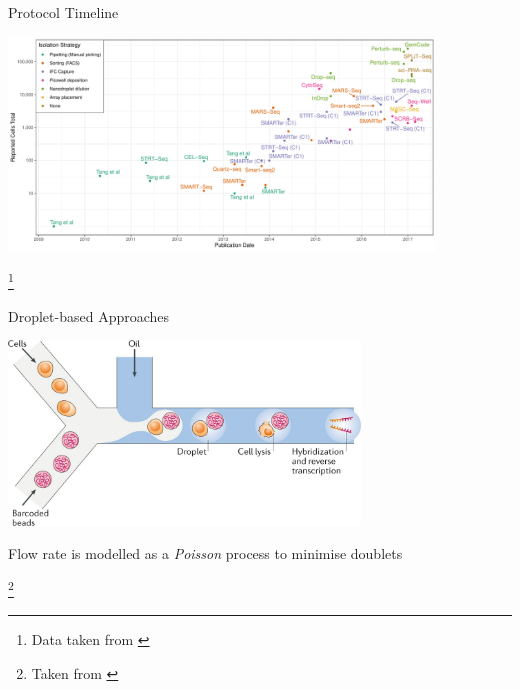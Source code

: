 \documentclass[aspectratio=169,11pt]{beamer}
\newcommand\blfootnote[1]{%
  \begingroup
  \renewcommand\thefootnote{}\footnote{#1}%
  \addtocounter{footnote}{-1}%
  \endgroup
}
\begin{document}
\begin{frame}{Protocol Timeline}

	\begin{center}
		\includegraphics[width=0.85\textwidth]{figures/scRNATimeline.pdf} 
	\end{center}

	\blfootnote{Data taken from \cite{pmid29494575}}

\end{frame}

\begin{frame}{Droplet-based Approaches}

	\begin{center}
		\includegraphics[width=0.7\textwidth]{figures/Droplet.jpg}
	\end{center}
	
	\pause
	Flow rate is modelled as a \textit{Poisson} process to minimise doublets
	
	\blfootnote{Taken from \cite{pmid29789704}}

\end{frame}
\end{document}
